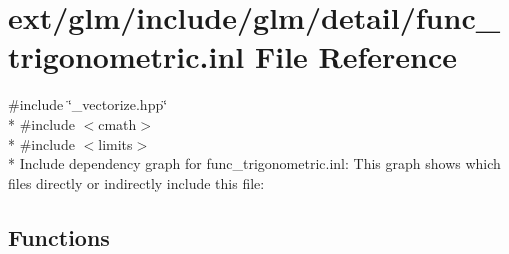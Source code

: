 \hypertarget{func__trigonometric_8inl}{\section{ext/glm/include/glm/detail/func\-\_\-trigonometric.inl File Reference}
\label{func__trigonometric_8inl}
}
{\ttfamily \#include \char`\"{}\-\_\-vectorize.\-hpp\char`\"{}}\\*
{\ttfamily \#include $<$cmath$>$}\\*
{\ttfamily \#include $<$limits$>$}\\*
Include dependency graph for func\-\_\-trigonometric.\-inl\-:
This graph shows which files directly or indirectly include this file\-:
\subsection*{Functions}
